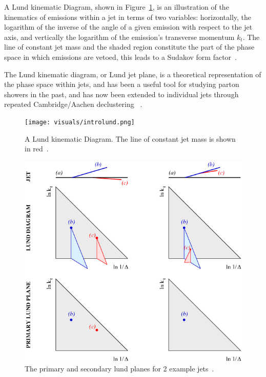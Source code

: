 A Lund kinematic Diagram, shown in Figure~\ref{fig:introlund}, is an illustration of the kinematics of emissions within a jet in terms of two variables: horizontally, the logarithm of the inverse of the angle of a given emission with respect to the jet axis, and vertically the logarithm of the emission's transverse momentum $k_t$. The line of constant jet mass and the shaded region constitute the part of the phase space in which emissions are vetoed, this leads to a Sudakov form factor~\cite{mmdt}.

The Lund kinematic diagram, or Lund jet plane, is a theoretical representation of the phase space within jets, and has been a useful tool for studying parton showers in the past, and has now been extended to individual jets through repeated Cambridge/Aachen declustering ~\cite{Dreyer:2018nbf}.



\begin{figure}[htb]
\centering
\texttt{[image: visuals/introlund.png]}
\caption{A Lund kinematic Diagram. The line of constant jet mass is shown in red~\cite{mmdt}.  }
\label{fig:introlund}
\end{figure}



\begin{figure}[htb]
\centering
\includegraphics[width=1.0\textwidth]{visuals/figs_lund.png}
\caption{The primary and secondary lund planes for 2 example jets~\cite{Dreyer:2018nbf}.}
\label{fig:lundPrimaryandSecondary}
\end{figure}



